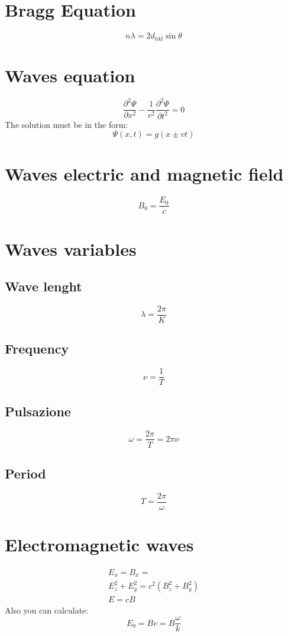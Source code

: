 \documentclass[Master.tex]{subfiles}
\begin{document}
\begin{multicols}{2}

		 \section{Bragg Equation}

		  \[n \lambda = 2d_{hkl} \sin \theta \]

		 \section{Waves equation}
		  \[
		  \frac{\partial ^2\Psi }{\partial x^2 } - \frac{1}{v^2} \frac{\partial ^2 \Psi}{\partial t^2} = 0
				  \]
				  The solution must be in the form:
				  \[
						   \Psi (x,t) = g(x  \pm vt)
				  \]

				  \section{Waves electric and magnetic field}
				   \[
						    B_{0} = \frac{E_0}{c}
				   \]

				  \section{Waves variables}
				   \subsection{Wave lenght}
						    \[
								     \lambda = \frac{2\pi }{K}
						    \]

				   \subsection{Frequency}
						    \[
								     \nu = \frac{1}{T}
						    \]

				   \subsection{Pulsazione}
						    \[
								     \omega = \frac{2\pi }{T} = 2\pi  \nu
						    \]

				   \subsection{Period}
						    \[
								     T = \frac{2\pi }{\omega }
						    \]

				  \section{Electromagnetic waves}
				   \begin{gather*}
						    E_{x} = B_{x} = \\
						    E_{z}^2 + E_{y}^2 = c^2 (B_{z}^2 + B_{y}^2) \\
						    E = cB
				   \end{gather*}
				   Also you can calculate:
				   \[
						    E_0 = Bv = B \frac{\omega}{k}
				   \]


\end{multicols}
\end{document}
